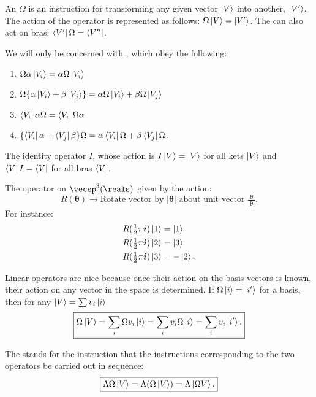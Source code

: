 An  $\Omega$ is an instruction for transforming any given vector $\ket{V}$ into another, $\ket{V'}$. The action of the operator is represented as follows: $\Omega\ket{V} = \ket{V'}$. The can also act on bras: $\bra{V'}\Omega = \bra{V''}$.
\begin{shaded*}
We will only be concerned with , which obey the following:
\begin{enumerate}
    \item $\Omega \alpha \ket{V_i} = \alpha\Omega\ket{V_i}$
    \item $\Omega\{\alpha\ket{V_i} + \beta\ket{V_j}\} = \alpha\Omega\ket{V_i} + \beta\Omega\ket{V_j}$
    \item $\bra{V_i}\alpha\Omega = \bra{V_i}\Omega\alpha$
    \item $\{\bra{V_i}\alpha + \bra{V_j}\beta\}\Omega = \alpha\bra{V_i}\Omega + \beta\bra{V_j}\Omega$.
\end{enumerate}
\end{shaded*}

\begin{example}
The identity operator $I$, whose action is $I\ket{V} = \ket{V}$ for all kets $\ket{V}$ and $\bra{V}I = \bra{V}$ for all bras $\bra{V}$.
\end{example}

\begin{example}
The operator on $\vecsp^3(\reals)$ given by the action: $$R(\bm{\theta}) \rightarrow \text{Rotate vector by } |\bm{\theta}| \text{ about unit vector } \tfrac{\bm{\theta}}{|\bm{\theta}|}.$$ For instance:
\begin{align*}
    R(\tfrac{1}{2}\pi \bm{i})\ket{1} &= \ket{1} \\
    R(\tfrac{1}{2}\pi \bm{i})\ket{2} &= \ket{3} \\
    R(\tfrac{1}{2}\pi \bm{i})\ket{3} &= -\ket{2}.
\end{align*}
\end{example}

Linear operators are nice because once their action on the basis vectors is known, their action on any vector in the space is determined. If $\Omega\ket{i} = \ket{i'}$ for a basis, then for any $\ket{V} = \sum v_i \ket{i}$
\begin{equation}\label{linear operator action on arbitrary vector}
    \boxed{\Omega\ket{V} = \sum_i \Omega v_i\ket{i} = \sum_i v_i \Omega\ket{i} = \sum_i v_i\ket{i'}.}
\end{equation}

The  stands for the instruction that the instructions corresponding to the two operators be carried out in sequence:
\begin{equation}\label{operator product}
    \boxed{\Lambda\Omega\ket{V} = \Lambda(\Omega\ket{V}) = \Lambda\ket{\Omega V}.}
\end{equation}

